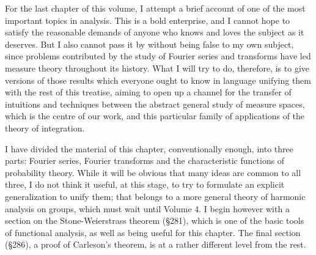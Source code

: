  
\def\chaptername{Fourier analysis} 
\def\sectionname{Introduction} 
 
 
For the last chapter of this volume, I attempt a brief account of one of 
the most important topics in analysis.   This is a bold enterprise, and 
I cannot hope to satisfy the reasonable demands of anyone who knows and 
loves the subject as it deserves.   But I also cannot pass it by without 
being false to my own subject, since problems contributed by the 
study of Fourier series and transforms have led measure theory 
throughout its history.   What I will try to do, therefore, is to give 
versions of those results which everyone ought to know in language 
unifying them with the rest of this treatise, aiming to open up a 
channel for the transfer of intuitions and techniques between the 
abstract general study of measure spaces, which is the centre of our 
work, and this particular family of applications of the theory of 
integration. 
 
I have divided the material of this chapter, conventionally enough, into 
three parts:  Fourier series, Fourier transforms and the characteristic 
functions of probability theory.   While it will be obvious that many 
ideas are common to all three, I do not think it useful, at this stage, 
to try to formulate an explicit generalization to unify them;  that 
belongs to a more general theory of harmonic analysis on groups, which 
must wait until Volume 4.   I begin however with a section on the 
Stone-Weierstrass theorem (\S281), which is one of the basic tools of 
functional analysis, as well as being useful for this chapter.   The 
final section (\S286), a proof of Carleson's theorem, is at a rather 
different level from the rest. 
 
\discrpage 
 
